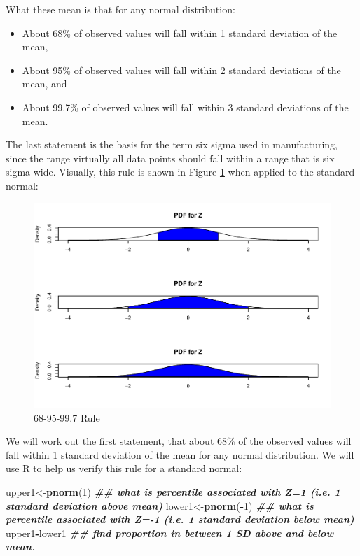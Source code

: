 \documentclass[
]{book}
\newenvironment{Shaded}{\begin{snugshade}}{\end{snugshade}}
\newcommand{\DecValTok}[1]{\textcolor[rgb]{0.00,0.00,0.81}{#1}}
\newcommand{\DocumentationTok}[1]{\textcolor[rgb]{0.56,0.35,0.01}{\textbf{\textit{#1}}}}
\newcommand{\FunctionTok}[1]{\textcolor[rgb]{0.13,0.29,0.53}{\textbf{#1}}}
\newcommand{\NormalTok}[1]{#1}
\newcommand{\OtherTok}[1]{\textcolor[rgb]{0.56,0.35,0.01}{#1}}
\newcommand{\SpecialCharTok}[1]{\textcolor[rgb]{0.81,0.36,0.00}{\textbf{#1}}}
\providecommand{\tightlist}{%
  \setlength{\itemsep}{0pt}\setlength{\parskip}{0pt}}
\begin{document}
What these mean is that for any normal distribution:

\begin{itemize}
\tightlist
\item
  About 68\% of observed values will fall within 1 standard deviation of the mean,
\item
  About 95\% of observed values will fall within 2 standard deviations of the mean, and
\item
  About 99.7\% of observed values will fall within 3 standard deviations of the mean.
\end{itemize}

The last statement is the basis for the term six sigma used in manufacturing, since the range virtually all data points should fall within a range that is six sigma wide. Visually, this rule is shown in Figure \ref{fig:4-rule} when applied to the standard normal:

\begin{figure}
\centering
\includegraphics{bookdown-demo_files/figure-latex/4-rule-1.pdf}
\caption{\label{fig:4-rule}68-95-99.7 Rule}
\end{figure}

We will work out the first statement, that about 68\% of the observed values will fall within 1 standard deviation of the mean for any normal distribution. We will use R to help us verify this rule for a standard normal:

\begin{Shaded}
\begin{Highlighting}[]
\NormalTok{upper1}\OtherTok{\textless{}{-}}\FunctionTok{pnorm}\NormalTok{(}\DecValTok{1}\NormalTok{) }\DocumentationTok{\#\# what is percentile associated with Z=1 (i.e. 1 standard deviation above mean)}
\NormalTok{lower1}\OtherTok{\textless{}{-}}\FunctionTok{pnorm}\NormalTok{(}\SpecialCharTok{{-}}\DecValTok{1}\NormalTok{) }\DocumentationTok{\#\# what is percentile associated with Z={-}1 (i.e. 1 standard deviation below mean)}
\NormalTok{upper1}\SpecialCharTok{{-}}\NormalTok{lower1 }\DocumentationTok{\#\# find proportion in between 1 SD above and below mean.}
\end{Highlighting}
\end{Shaded}
\end{document}
